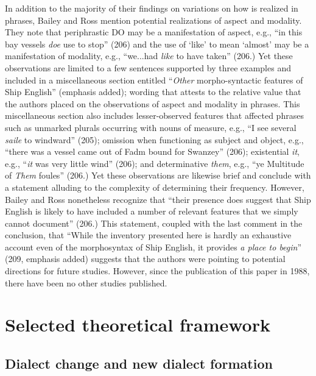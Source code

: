In addition to the majority of their findings on variations on how  is realized in  phrases, Bailey and Ross mention potential realizations of aspect and modality. They note that periphrastic DO may be a manifestation of aspect, e.g., “in this bay vessels \textit{doe} use to stop” (206) and the use of ‘like’ to mean ‘almost’ may be a manifestation of modality, e.g., “we...had \textit{like} to have taken” (206.) Yet these observations are limited to a few sentences supported by three examples and included in a miscellaneous section entitled “\textit{Other} morpho-syntactic features of Ship English” (emphasis added); wording that attests to the relative value that the authors placed on the observations of aspect and modality in  phrases. This miscellaneous section also includes lesser-observed features that affected  phrases such as unmarked plurals occurring with nouns of measure, e.g., “I see several \textit{saile} to windward” (205);  omission when functioning as subject and object, e.g., “there was a vessel came out of Fadm bound for Swanzey” (206); existential \textit{it}, e.g., “\textit{it} was very little wind” (206); and determinative \textit{them}, e.g., “ye Multitude of \textit{Them} foules” (206.) Yet these observations are likewise brief and conclude with a statement alluding to the complexity of determining their frequency. However, Bailey and Ross nonetheless recognize that “their presence does suggest that Ship English is likely to have included a number of relevant features that we simply cannot document” (206.) This statement, coupled with the last comment in the conclusion, that “While the inventory presented here is hardly an exhaustive account even of the morphosyntax of Ship English, it provides \textit{a place to begin}” (209, emphasis added) suggests that the authors were pointing to potential directions for future studies. However, since the publication of this paper in 1988, there have been no other studies published.  

\section{{Selected theoretical framework}}\label{sec:2.2}

\subsection{{Dialect change and new dialect formation} }\label{sec:2.2.1}

